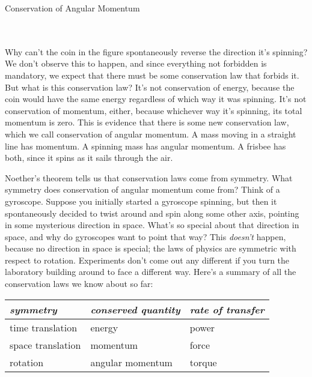 \begin{lab}{Conservation of Angular Momen\-tum}\label{lab:torque}
\apparatus
{}\\
\\
\\

\labintroduction

Why can't the coin in the figure spontaneously reverse the direction it's spinning?
We don't observe this to happen, and since everything not forbidden is mandatory, we
expect that there must be some conservation law that forbids it. But what is this
conservation law? It's not conservation of energy, because the coin would have the
same energy regardless of which way it was spinning. It's not conservation of momentum,
either, because whichever way it's spinning, its total momentum is zero. This is
evidence that there is some new conservation law, which we call conservation of
angular momentum. A mass moving in a straight line has momentum. A spinning mass
has angular momentum. A frisbee has both, since it spins as it sails through the air.


Noether's theorem tells us that conservation laws come from symmetry. What symmetry
does conservation of angular momentum come from? Think of a gyroscope. Suppose you initially
started a gyroscope spinning, but then it spontaneously decided to twist around and
spin along some other axis, pointing in some mysterious direction in space. What's
so special about that direction in space, and why do gyroscopes want to point that way?
This \emph{doesn't} happen, because no direction in space is special; the laws of
physics are symmetric with respect to rotation. Experiments don't come out any different
if you turn the laboratory building around to face a different way. Here's a summary
of all the conservation laws we know about so far:

\begin{tabular}{|p{20mm}|p{20mm}|p{20mm}|}
\hline
\emph{symmetry} & \emph{conserved quantity} & \emph{rate of transfer} \\
\hline
time translation & energy & power \\
\hline
space translation & momentum & force \\
\hline
rotation & angular momentum & torque\\
\hline
\end{tabular}


\end{lab}
